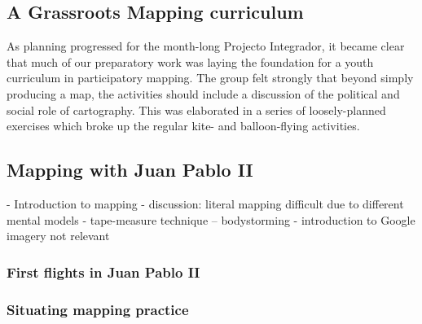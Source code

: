 \documentclass[11pt]{report}
\begin{document}
\subsection{A Grassroots Mapping curriculum}

As planning progressed for the month-long Projecto Integrador, it became clear that much of our preparatory work was laying the foundation for a youth curriculum in participatory mapping. The group felt strongly that beyond simply producing a map, the activities should include a discussion of the political and social role of cartography. This was elaborated in a series of loosely-planned exercises which broke up the regular kite- and balloon-flying activities. 

\subsection{Mapping with Juan Pablo II}

                - Introduction to mapping
                    - discussion: literal mapping difficult due to different mental models
                    - tape-measure technique -- bodystorming
                    - introduction to Google imagery not relevant
\subsubsection{First flights in Juan Pablo II}


\subsubsection{Situating mapping practice}

\end{document}
